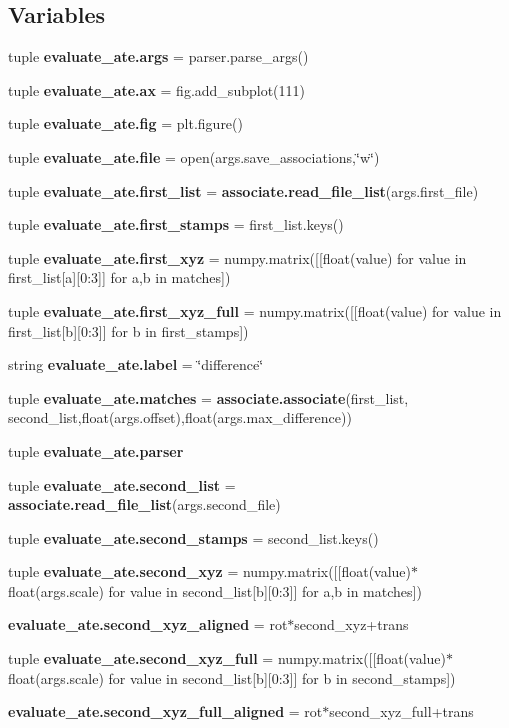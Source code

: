 \subsection*{\-Variables}
\begin{DoxyCompactItemize}
\item 
tuple {\bf evaluate\-\_\-ate.\-args} = parser.\-parse\-\_\-args()
\item 
tuple {\bf evaluate\-\_\-ate.\-ax} = fig.\-add\-\_\-subplot(111)
\item 
tuple {\bf evaluate\-\_\-ate.\-fig} = plt.\-figure()
\item 
tuple {\bf evaluate\-\_\-ate.\-file} = open(args.\-save\-\_\-associations,\char`\"{}w\char`\"{})
\item 
tuple {\bf evaluate\-\_\-ate.\-first\-\_\-list} = {\bf associate.\-read\-\_\-file\-\_\-list}(args.\-first\-\_\-file)
\item 
tuple {\bf evaluate\-\_\-ate.\-first\-\_\-stamps} = first\-\_\-list.\-keys()
\item 
tuple {\bf evaluate\-\_\-ate.\-first\-\_\-xyz} = numpy.\-matrix([[float(value) for value in first\-\_\-list[a][0\-:3]] for a,b in matches])
\item 
tuple {\bf evaluate\-\_\-ate.\-first\-\_\-xyz\-\_\-full} = numpy.\-matrix([[float(value) for value in first\-\_\-list[b][0\-:3]] for b in first\-\_\-stamps])
\item 
string {\bf evaluate\-\_\-ate.\-label} = \char`\"{}difference\char`\"{}
\item 
tuple {\bf evaluate\-\_\-ate.\-matches} = {\bf associate.\-associate}(first\-\_\-list, second\-\_\-list,float(args.\-offset),float(args.\-max\-\_\-difference))
\item 
tuple {\bf evaluate\-\_\-ate.\-parser}
\item 
tuple {\bf evaluate\-\_\-ate.\-second\-\_\-list} = {\bf associate.\-read\-\_\-file\-\_\-list}(args.\-second\-\_\-file)
\item 
tuple {\bf evaluate\-\_\-ate.\-second\-\_\-stamps} = second\-\_\-list.\-keys()
\item 
tuple {\bf evaluate\-\_\-ate.\-second\-\_\-xyz} = numpy.\-matrix([[float(value)$\ast$float(args.\-scale) for value in second\-\_\-list[b][0\-:3]] for a,b in matches])
\item 
{\bf evaluate\-\_\-ate.\-second\-\_\-xyz\-\_\-aligned} = rot$\ast$second\-\_\-xyz+trans
\item 
tuple {\bf evaluate\-\_\-ate.\-second\-\_\-xyz\-\_\-full} = numpy.\-matrix([[float(value)$\ast$float(args.\-scale) for value in second\-\_\-list[b][0\-:3]] for b in second\-\_\-stamps])
\item 
{\bf evaluate\-\_\-ate.\-second\-\_\-xyz\-\_\-full\-\_\-aligned} = rot$\ast$second\-\_\-xyz\-\_\-full+trans
\end{DoxyCompactItemize}

